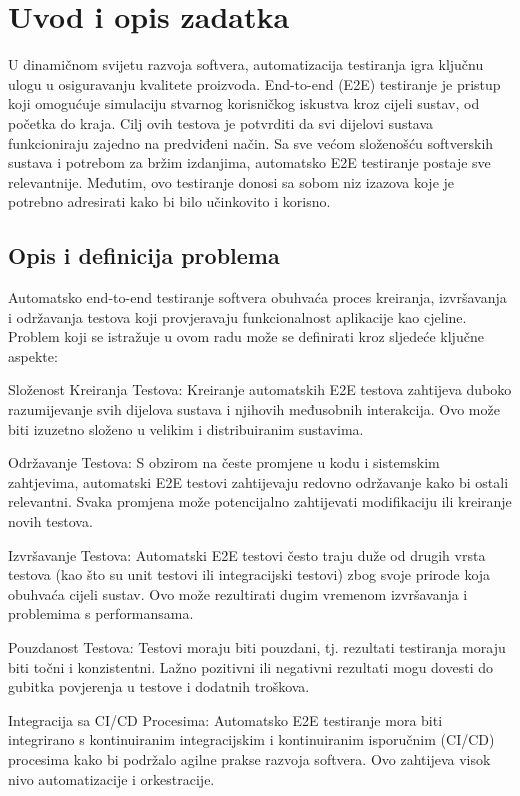 \chapter{Uvod i opis zadatka}\label{OpisIOgranicenja}
U dinamičnom svijetu razvoja softvera, automatizacija testiranja igra ključnu ulogu u osiguravanju kvalitete proizvoda.
End-to-end (E2E) testiranje je pristup koji omogućuje simulaciju stvarnog korisničkog iskustva kroz cijeli sustav, od početka do kraja.
Cilj ovih testova je potvrditi da svi dijelovi sustava funkcioniraju zajedno na predviđeni način.
Sa sve većom složenošću softverskih sustava i potrebom za bržim izdanjima, automatsko E2E testiranje postaje sve relevantnije. 
Međutim, ovo testiranje donosi sa sobom niz izazova koje je potrebno adresirati kako bi bilo učinkovito i korisno.


\section*{Opis i definicija problema}
Automatsko end-to-end testiranje softvera obuhvaća proces kreiranja, izvršavanja i održavanja testova koji provjeravaju funkcionalnost aplikacije kao cjeline.
Problem koji se istražuje u ovom radu može se definirati kroz sljedeće ključne aspekte:

Složenost Kreiranja Testova: Kreiranje automatskih E2E testova zahtijeva duboko razumijevanje svih dijelova sustava i njihovih međusobnih interakcija.
Ovo može biti izuzetno složeno u velikim i distribuiranim sustavima.

Održavanje Testova: S obzirom na česte promjene u kodu i sistemskim zahtjevima, automatski E2E testovi zahtijevaju redovno održavanje kako bi ostali relevantni.
Svaka promjena može potencijalno zahtijevati modifikaciju ili kreiranje novih testova.

Izvršavanje Testova: Automatski E2E testovi često traju duže od drugih vrsta testova (kao što su unit testovi ili integracijski testovi) zbog svoje prirode koja obuhvaća cijeli sustav. 
Ovo može rezultirati dugim vremenom izvršavanja i problemima s performansama.

Pouzdanost Testova: Testovi moraju biti pouzdani, tj. rezultati testiranja moraju biti točni i konzistentni. 
Lažno pozitivni ili negativni rezultati mogu dovesti do gubitka povjerenja u testove i dodatnih troškova.

Integracija sa CI/CD Procesima: Automatsko E2E testiranje mora biti integrirano s kontinuiranim integracijskim i kontinuiranim isporučnim (CI/CD) procesima kako bi podržalo agilne prakse razvoja softvera. Ovo zahtijeva visok nivo automatizacije i orkestracije.


